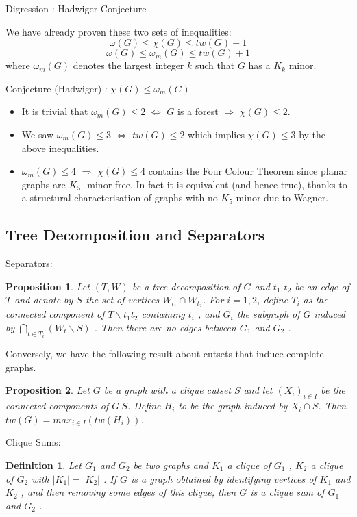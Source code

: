 \documentclass[12pt,a4paper]{article}
\newtheorem{prop}{Proposition}
\newtheorem{definition}{Definition}
\begin{document}
Digression : Hadwiger Conjecture

We have already proven these two sets of inequalities:
$$ \omega( G ) \leq \chi( G ) \leq tw( G ) + 1$$
$$ \omega( G ) \leq \omega_m ( G ) \leq tw( G ) + 1$$
where $\omega_m ( G )$ denotes the largest integer $k$ such that $G$ has a $K_k$ minor.

Conjecture (Hadwiger) : $\chi( G ) \leq \omega_m ( G )$\\
\begin{itemize}
\item It is trivial that $\omega_m ( G ) \leq 2$ $\Leftrightarrow$ $G$ is a forest $\Rightarrow$ $\chi( G ) \leq 2$.
\item We saw $\omega_m ( G ) \leq 3$ $\Leftrightarrow$ $tw( G ) \leq 2$ which implies $\chi( G ) \leq 3$ by the above
inequalities.
\item $\omega_m ( G ) \leq 4$ $\Rightarrow$ $\chi( G ) \leq 4$ contains the Four Colour Theorem since planar
graphs are $K_5$ -minor free. In fact it is equivalent (and hence true), thanks to a
structural characterisation of graphs with no $K_5$ minor due to Wagner.
\end{itemize}


\subsection{Tree Decomposition and Separators}
Separators:

\begin{prop}
Let $( T , W )$ be a tree decomposition of $G$ and $t_1$ $t_2$ be an edge of $T$ and denote by
$S$ the set of vertices $W_{t_1} \cap W_{t_2}$. For $i = 1 , 2$, define $T_i$ as the connected component
of $T \backslash t_1 t_2$ containing $t_i$ , and $G_i$ the subgraph of $G$ induced by $\bigcap_{t \in T_i} ( W_t \backslash S )$ . Then
there are no edges between $G_1$ and $G_2$ .
\end{prop}

Conversely, we have the following result about cutsets that induce complete
graphs.

\begin{prop}
Let $G$ be a graph with a clique cutset $S$ and let $( X_i )_{i \in I}$ be the connected
components of $G \ S$. Define $H_i$ to be the graph induced by $X_i \cap S$. Then
$tw( G ) = max_{i \in I} (tw( H_i ))$.
\end{prop}

Clique Sums:

\begin{definition}
Let $G_1$ and $G_2$ be two graphs and $K_1$ a clique of $G_1$ , $K_2$ a clique of $G_2$ with
$| K_1 | = | K_2 |$ . If $G$ is a graph obtained by identifying vertices of $K_1$ and $K_2$ , and then
removing some edges of this clique, then $G$ is a clique sum of $G_1$ and $G_2$ .
\end{definition}
\end{document}
